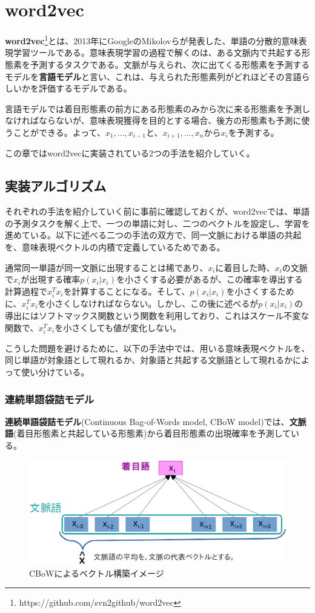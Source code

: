\chapter{word2vec}
\textbf{word2vec}\footnote{https://github.com/svn2github/word2vec}とは、2013年にGoogleのMikolovらが発表した、単語の分散的意味表現学習ツールである。意味表現学習の過程で解くのは、ある文脈内で共起する形態素を予測するタスクである。文脈が与えられ、次に出てくる形態素を予測するモデルを\textbf{言語モデル}と言い、これは、与えられた形態素列がどれほどその言語らしいかを評価するモデルである。

言語モデルでは着目形態素の前方にある形態素のみから次に来る形態素を予測しなければならないが、意味表現獲得を目的とする場合、後方の形態素も予測に使うことができる。よって、$x_1,...,x_{i-1}$と、$x_{i+1},...,x_n$から$x_i$を予測する。

この章ではword2vecに実装されている2つの手法を紹介していく。

\section{実装アルゴリズム}
それぞれの手法を紹介していく前に事前に確認しておくが、word2vecでは、単語の予測タスクを解く上で、一つの単語に対し、二つのベクトルを設定し、学習を進めている。以下に述べる二つの手法の双方で、同一文脈における単語の共起を、意味表現ベクトルの内積で定義しているためである。

通常同一単語が同一文脈に出現することは稀であり、$x_i$に着目した時、$x_i$の文脈で$x_i$が出現する確率$p(x_i|x_i)$を小さくする必要があるが、この確率を導出する計算過程で$x_i^Tx_i$を計算することになる。そして、$p(x_i|x_i)$を小さくするために、$x_i^Tx_i$を小さくしなければならない。しかし、この後に述べるが$p(x_i|x_i)$の導出にはソフトマックス関数という関数を利用しており、これはスケール不変な関数で、$x_i^Tx_i$を小さくしても値が変化しない。

こうした問題を避けるために、以下の手法中では、用いる意味表現ベクトルを、同じ単語が対象語として現れるか、対象語と共起する文脈語として現れるかによって使い分けている。

\subsection{連続単語袋詰モデル}
\textbf{連続単語袋詰モデル}(Continuous Bag-of-Words model, CBoW model)では、\textbf{文脈語}(着目形態素と共起している形態素)から着目形態素の出現確率を予測している。
\begin{figure}[h]
  \centering
  \includegraphics[width=12.5cm]{../images/CBoW.eps}
  \caption{CBoWによるベクトル構築イメージ}
\end{figure}

